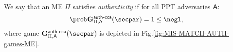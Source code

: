 \begin{definition}[Authenticity of ME]\label{def:me_auth}
    We say that an ME $\Pi$ satisfies {\em authenticity} if for all PPT adversaries $\mathsf{A}$:
    \[
        \Prob{\NISHeufgamecca{}_{\Pi, \adversary}(\secpar) = 1} \leq \negl,
    \]
    where game $\NISHeufgamecca{}_{\Pi, \adversary}(\secpar)$ is depicted in Fig.\ref{fig:MIS-MATCH-AUTH-games-ME}.
\end{definition}